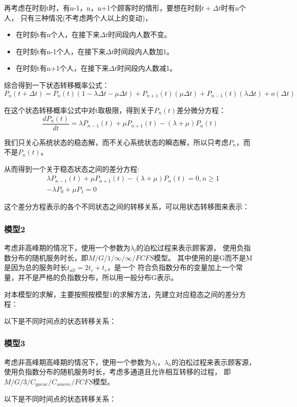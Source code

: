 再考虑在时刻t时，有n-1，n，n+1个顾客时的情形，要想在时刻$t+\Delta t$时有n个人，
只有三种情况(不考虑两个人以上的变动)，
\begin{itemize}
\item 在时刻t有n个人，在接下来$\Delta t$时间段内人数不变。
\item 在时刻t有n-1个人，在接下来$\Delta t$时间段内人数加1。
\item 在时刻t有n+1个人，在接下来$\Delta t$时间段内人数减1。 
\end{itemize}


综合得到一下状态转移概率公式：
\begin{equation}
    P_n(t+\Delta t)=P_n(t)(1-\lambda \Delta t-\mu \Delta t)+P_{n+1}(t)(\mu \Delta t) +P_{n-1}(t)(\lambda \Delta t)+o(\Delta t)
\end{equation}

在这个状态转移概率公式中对t取极限，得到关于$P_n(t)$差分微分方程：
\begin{equation}
    \frac{d P_n(t)}{dt}=\lambda P_{n-1}(t)+\mu P_{n+1}(t)-(\lambda+\mu )P_n(t)
\end{equation}

我们只关心系统状态的稳态解，而不关心系统状态的瞬态解，所以只考虑$P_n$，而不是$P_n(t)$。

从而得到一个关于稳态状态之间的差分方程:
\begin{equation}
    \begin{aligned}
        & \lambda P_{n-1}(t)+\mu P_{n+1}(t)-(\lambda+\mu )P_n(t)=0,n\geq 1 \\
        & -\lambda P_{0}+\mu P_{1}=0
    \end{aligned}
\end{equation}

这个差分方程表示的各个不同状态之间的转移关系，可以用状态转移图来表示：


\subsubsection{模型2}
考虑非高峰期的情况下，使用一个参数为$\lambda_{l}$的泊松过程来表示顾客源，
使用负指数分布的随机服务时长，即$M/G/1/\infty/\infty/FCFS$模型。
其中使用的是G而不是M是因为总的服务时长$t_{all}=2t_{c}+t_{r}$，是一个
符合负指数分布的变量加上一个常量，并不是严格的负指数分布，所以用一般分布G表示。

对本模型的求解，主要按照按模型1的求解方法，先建立对应稳态之间的差分方程：


以下是不同时间点的状态转移关系：

\subsubsection{模型3}
考虑非高峰期高峰期的情况下，使用一个参数为$\lambda_{l}，\lambda_{h}$的泊松过程来表示顾客源，
使用负指数分布的随机服务时长，考虑多通道且允许相互转移的过程，
即$M/G/3/C_{queue}/C_{source}/FCFS$模型。

以下是不同时间点的状态转移关系：
